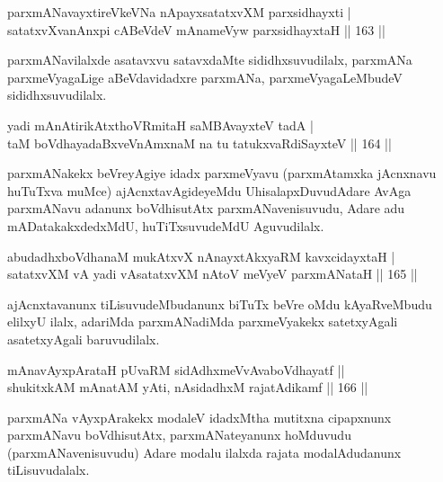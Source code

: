 \begin{shl}
parxmANavayxtireVkeVNa nApayxsatatxvXM parxsidhayxti | \\
satatxvXvanAnxpi cABeVdeV mAnameVyw parxsidhayxtaH \hfill||  163 ||  
\end{shl}

\begin{artha}
parxmANavilalxde asatavxvu satavxdaMte sididhxsuvudilalx, parxmANa parxmeVyagaLige aBeVdavidadxre parxmANa, parxmeVyagaLeMbudeV sididhxsuvudilalx.
\end{artha}


\begin{shl}
yadi mAnAtirikAtxthoVR\s mitaH saMBAvayxteV tadA | \\
taM boVdhayadaBxveVnAmxnaM na tu tatukxvaRdiSayxteV \hfill||  164 ||  
\end{shl}

\begin{artha}
parxmANakekx beVreyAgiye idadx parxmeVyavu (parxmAtamxka jAcnxnavu huTuTxva muMce) ajAcnxtavAgideyeMdu UhisalapxDuvudAdare AvAga parxmANavu adanunx boVdhisutAtx parxmANavenisuvudu, Adare adu mADatakakxdedxMdU, huTiTxsuvudeMdU Aguvudilalx.
\end{artha}

\begin{shl}
abudadhxboVdhanaM mukAtxvX nAnayxtAkxyaRM kavxcidayxtaH | \\
satatxvXM vA yadi vA\s satatxvXM nAtoV meVyeV parxmANataH \hfill||  165 ||  
\end{shl}

\begin{artha}
ajAcnxtavanunx tiLisuvudeMbudanunx biTuTx beVre oMdu kAyaRveMbudu elilxyU ilalx, adariMda parxmANadiMda parxmeVyakekx satetxyAgali asatetxyAgali baruvudilalx.
\end{artha}

\begin{shl}
mAnavAyxpArataH pUvaRM sidAdhxmeVvAvaboVdhayatf ||  \\
shukitxkAM mAnatAM yAti, nAsidadhxM rajatAdikamf \hfill||  166 ||  
\end{shl}

\begin{artha}
parxmANa vAyxpArakekx modaleV idadxMtha mutitxna cipapxnunx parxmANavu boVdhisutAtx, parxmANateyanunx hoMduvudu (parxmANavenisuvudu) Adare modalu ilalxda rajata modalAdudanunx tiLisuvudalalx.
\end{artha}

